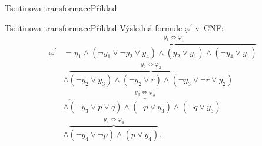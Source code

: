 \documentclass[11pt,professionalfont,aspectratio=43]{beamer}
\begin{document}
    \begin{frame}{Tseitinova transformace}{Příklad}
        \begin{itemize}
        \end{itemize}
    \end{frame}

    \begin{frame}{Tseitinova transformace}{Příklad}
        Výsledná formule $\varphi^{\prime}$ v~CNF:
        \begin{align*}
            \varphi^{\prime}&=y_1\land\overbrace{(\neg y_1 \lor \neg y_2 \lor y_4) \land (y_2 \lor y_1) \land (\neg y_4 \lor y_1)}^{y_1\iff \varphi_1} \\
            &\land\overbrace{(\neg y_2\lor y_3)\land (\neg y_2\lor r) \land (\neg y_3\lor \neg r\lor y_2)}^{y_2\iff\varphi_2} \\
            &\land\overbrace{(\neg y_3\lor p\lor q)\land (\neg p\lor y_3)\land (\neg q\lor y_3)}^{y_3\iff\varphi_3} \\
            &\land\overbrace{(\neg y_4\lor \neg p)\land (p\lor y_4)}^{y_4\iff\varphi_4}.
        \end{align*}
    \end{frame}
\end{document}
